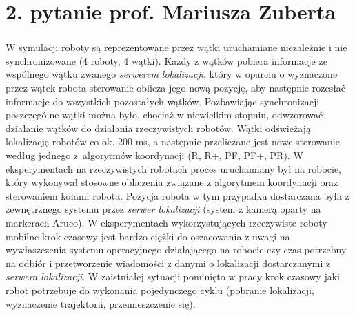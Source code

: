 \section*{2. pytanie prof. Mariusza Zuberta}
\begin{frame}
\frametitle{\secname}
\framesubtitle{\fontsize{4}{1}\selectfont{W pracy w zasadzie przedstawiono zaprezentowano algorytmy (R, R+ i PR) natomiast nie zostało dla mnie jasno przedstawiono czy w trakcie ,,pobieranie lokalizacji'' następuje synchronizacja tych algorytmów czy działają asynchronicznie. Jak to się ma do symulacji, która jest przeprowadzona z krokiem 0.2 sekundy. Dlatego proszę o wyjaśnienie jak jest różnica wzajemnej synchronizacji jednostek mobilnych podczas symulacji i rzeczywistych testów. }}

\scriptsize

W symulacji roboty są reprezentowane przez wątki uruchamiane niezależnie i nie synchronizowane (4 roboty, 4 wątki). Każdy z wątków pobiera informacje ze wspólnego wątku zwanego \textit{serwerem lokalizacji}, który w oparciu o wyznaczone przez wątek robota sterowanie oblicza jego nową pozycję, aby następnie rozesłać informacje do wszystkich pozostałych wątków. Pozbawiając synchronizacji poszczególne wątki można było, chociaż w niewielkim stopniu, odwzorować działanie wątków do działania rzeczywistych robotów. Wątki odświeżają lokalizację robotów co ok. 200 ms, a następnie przeliczane jest nowe sterowanie według jednego z~algorytmów koordynacji (R, R+, PF, PF+, PR).
\newline
\newline
W eksperymentach na rzeczywistych robotach proces uruchamiany był na robocie, który wykonywał stosowne obliczenia związane z algorytmem koordynacji oraz sterowaniem kołami robota. Pozycja robota w tym przypadku dostarczana była z zewnętrznego systemu przez \textit{serwer lokalizacji} (system z kamerą oparty na markerach Aruco). W eksperymentach wykorzystujących rzeczywiste roboty mobilne krok czasowy jest bardzo ciężki do oszacowania z uwagi na wywłaszczenia systemu operacyjnego działającego na robocie czy czas potrzebny na odbiór i przetworzenie wiadomości z danymi o lokalizacji dostarczanymi z \textit{serwera lokalizacji}. W zaistniałej sytuacji pominięto w pracy krok czasowy jaki robot potrzebuje do wykonania pojedynczego cyklu (pobranie lokalizacji,  wyznaczenie trajektorii, przemieszczenie się). 



\end{frame}
